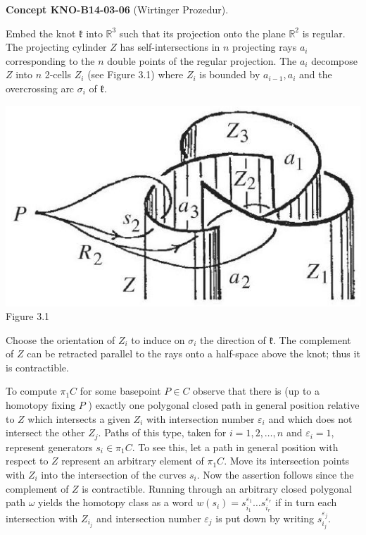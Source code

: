 \documentclass[10pt, letterpaper]{article}
\newcommand{\CustomHeading}[3]{%
  \par\medskip\noindent%
  \textbf{#1 #2} \textnormal{(#3)}.\enskip%
}
\newenvironment{CONC}[2]{\CustomHeading{Concept}{#1}{#2}}{}
\begin{document}
\begin{CONC}{KNO-B14-03-06}{Wirtinger Prozedur}
Embed the knot $\mathfrak{k}$ into $\mathbb{R}^{3}$ such that its projection onto the plane $\mathbb{R}^{2}$ is regular. The projecting cylinder $Z$ has self-intersections in $n$ projecting rays $a_{i}$ corresponding to the $n$ double points of the regular projection. The $a_{i}$ decompose $Z$ into $n$ 2-cells $Z_{i}$ (see Figure 3.1) where $Z_{i}$ is bounded by $a_{i-1}, a_{i}$ and the overcrossing arc $\sigma_{i}$ of $\mathfrak{k}$.

\includegraphics[scale=0.2]{2025_05_21_9c06be8de7a55410f8c1g-046}
Figure 3.1

Choose the orientation of $Z_{i}$ to induce on $\sigma_{i}$ the direction of $\mathfrak{k}$. The complement of $Z$ can be retracted parallel to the rays onto a half-space above the knot; thus it is contractible.

To compute $\pi_{1} C$ for some basepoint $P \in C$ observe that there is (up to a homotopy fixing $P$ ) exactly one polygonal closed path in general position relative to $Z$ which intersects a given $Z_{i}$ with intersection number $\varepsilon_{i}$ and which does not intersect the other $Z_{j}$. Paths of this type, taken for $i=1,2, \ldots, n$ and $\varepsilon_{i}=1$, represent generators $s_{i} \in \pi_{1} C$. To see this, let a path in general position with respect to $Z$ represent an arbitrary element of $\pi_{1} C$. Move its intersection points with $Z_{i}$ into the intersection of the curves $s_{i}$. Now the assertion follows since the complement of $Z$ is contractible. Running through an arbitrary closed polygonal path $\omega$ yields the homotopy class as a word $w\left(s_{i}\right)=s_{i_{1}}^{\varepsilon_{1}} \ldots s_{i_{r}}^{\varepsilon_{r}}$ if in turn each intersection with $Z_{i_{j}}$ and intersection number $\varepsilon_{j}$ is put down by writing $s_{i_{j}}^{\varepsilon_{j}}$.


\end{CONC}
\end{document}
